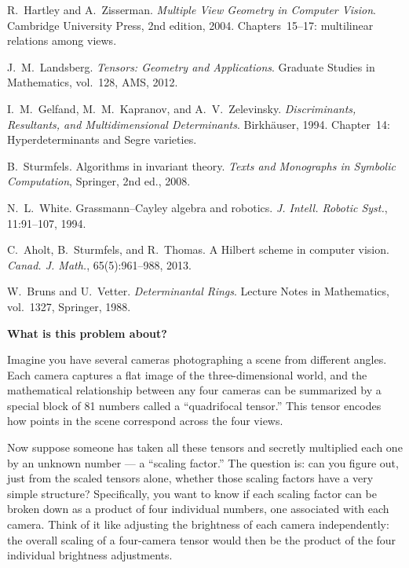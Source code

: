 
 R.~Hartley and A.~Zisserman.
\emph{Multiple View Geometry in Computer Vision}.
Cambridge University Press, 2nd edition, 2004.
Chapters~15--17: multilinear relations among views.

 J.~M.~Landsberg.
\emph{Tensors: Geometry and Applications}.
Graduate Studies in Mathematics, vol.~128, AMS, 2012.

 I.~M.~Gelfand, M.~M.~Kapranov, and A.~V.~Zelevinsky.
\emph{Discriminants, Resultants, and Multidimensional Determinants}.
Birkh\"auser, 1994. Chapter~14: Hyperdeterminants and Segre varieties.

 B.~Sturmfels.
Algorithms in invariant theory.
\emph{Texts and Monographs in Symbolic Computation}, Springer, 2nd ed., 2008.

 N.~L.~White.
Grassmann--Cayley algebra and robotics.
\emph{J. Intell. Robotic Syst.}, 11:91--107, 1994.

 C.~Aholt, B.~Sturmfels, and R.~Thomas.
A Hilbert scheme in computer vision.
\emph{Canad. J. Math.}, 65(5):961--988, 2013.

 W.~Bruns and U.~Vetter.
\emph{Determinantal Rings}.
Lecture Notes in Mathematics, vol.~1327, Springer, 1988.


\textbf{What is this problem about?}

Imagine you have several cameras photographing a scene from different angles.
Each camera captures a flat image of the three-dimensional world, and the
mathematical relationship between any four cameras can be summarized by a
special block of 81 numbers called a ``quadrifocal tensor.'' This tensor
encodes how points in the scene correspond across the four views.

Now suppose someone has taken all these tensors and secretly multiplied each
one by an unknown number --- a ``scaling factor.'' The question is: can you
figure out, just from the scaled tensors alone, whether those scaling factors
have a very simple structure? Specifically, you want to know if each scaling
factor can be broken down as a product of four individual numbers, one
associated with each camera. Think of it like adjusting the brightness of each
camera independently: the overall scaling of a four-camera tensor would then
be the product of the four individual brightness adjustments.

